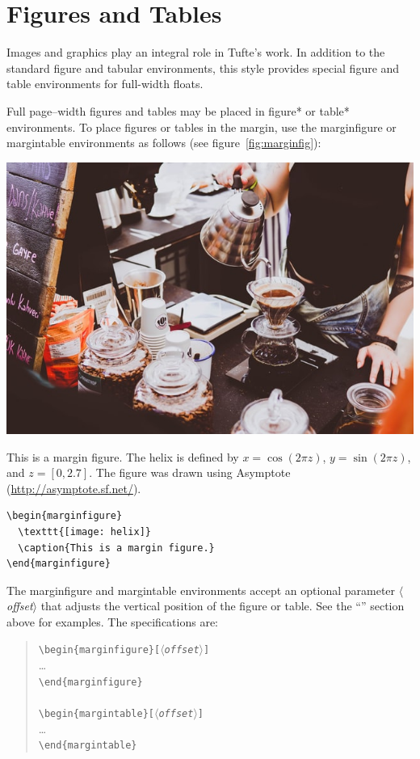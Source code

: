 \documentclass{tufte-handout}
\newcommand{\doccmd}[1]{\texttt{\textbackslash#1}}%
\newcommand{\docopt}[1]{\ensuremath{\langle}\textrm{\textit{#1}}\ensuremath{\rangle}}%
\newcommand{\docenv}[1]{\textsf{#1}}%
\newenvironment{docspec}{\begin{quote}\noindent}{\end{quote}}%
\begin{document}
\section{Figures and Tables}\label{sec:figures-and-tables}
Images and graphics play an integral role in Tufte's work.
In addition to the standard \docenv{figure} and \docenv{tabular} environments,
this style provides special figure and table environments for full-width
floats.

Full page--width figures and tables may be placed in \docenv{figure*} or
\docenv{table*} environments.  To place figures or tables in the margin,
use the \docenv{marginfigure} or \docenv{margintable} environments as follows
(see figure~\ref{fig:marginfig}):

\begin{marginfigure}%
  \includegraphics[width=\linewidth]{sample}
  \caption{This is a margin figure.  The helix is defined by 
    $x = \cos(2\pi z)$, $y = \sin(2\pi z)$, and $z = [0, 2.7]$.  The figure was
    drawn using Asymptote (\url{http://asymptote.sf.net/}).}
  \label{fig:marginfig}
\end{marginfigure}
\begin{Verbatim}
\begin{marginfigure}
  \texttt{[image: helix]}
  \caption{This is a margin figure.}
\end{marginfigure}
\end{Verbatim}

The \docenv{marginfigure} and \docenv{margintable} environments accept an optional parameter \docopt{offset} that adjusts the vertical position of the figure or table.  See the ``'' section above for examples.  The specifications are:
\begin{docspec}
  \doccmd{begin\{marginfigure\}[\docopt{offset}]}\\
  \qquad\ldots\\
  \doccmd{end\{marginfigure\}}\\
  \mbox{}\\
  \doccmd{begin\{margintable\}[\docopt{offset}]}\\
  \qquad\ldots\\
  \doccmd{end\{margintable\}}\\
\end{docspec}
\end{document}

